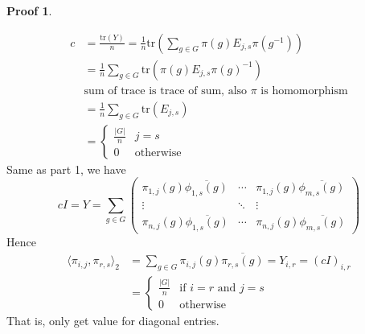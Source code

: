 \documentclass{book}
\newcommand{\inner}[1]{\langle #1 \rangle}
\newcommand{\abs}[1]{\lvert #1 \rvert }
\newcommand{\tr}[1]{\textrm{tr}( #1 )}
\theoremstyle{definition}
\theoremstyle{remarkstyle}
\newtheorem*{myproof}{Proof}%
\begin{document}
\begin{myproof}
\begin{itemize}
        \begin{align*}
            c &= \frac{\tr{Y}}{n} = \frac{1}{n}\tr{\sum_{g\in G}\pi(g)E_{j,s}\pi(g^{-1})} \\
            &= \frac{1}{n}\sum_{g\in G}\tr{\pi(g)E_{j,s}\pi(g)^{-1}} \\
            &\textrm{sum of trace is trace of sum, also $\pi$ is homomorphism} \\
            &= \frac{1}{n}\sum_{g\in G}\tr{E_{j,s}} \\
            &= \left\{
            \begin{array}{ll}
                \frac{\abs{G}}{n} & j=s  \\
                0 & \textrm{otherwise}
            \end{array}
            \right.
        \end{align*}
        Same as part 1, we have 
        $$
        cI = Y = \sum_{g\in G}\left(
            \begin{array}{ccc}
                \pi_{1,j}(g)\overline{\phi_{1,s}(g)} & \cdots & 
                \pi_{1,j}(g)\overline{\phi_{m,s}(g)}  \\
                \vdots & \ddots & \vdots \\
                \pi_{n,j}(g)\overline{\phi_{1,s}(g)} & \cdots &
                \pi_{n,j}(g)\overline{\phi_{m,s}(g)}
            \end{array}
            \right)
        $$
        Hence 
        \begin{align*}
            \inner{\pi_{i,j},\pi_{r,s}}_2 
             &= \sum_{g\in G}\pi_{i,j}(g)\overline{\pi_{r,s}(g)} = Y_{i,r} = (cI)_{i,r} \\
             &= \left\{
            \begin{array}{ll}
                \frac{\abs{G}}{n} & \textrm{if $i=r$ and $j=s$}  \\
                0 & \textrm{otherwise}
            \end{array}
            \right.
        \end{align*}
        That is, only get value for diagonal entries. \newline
    \end{itemize}
\end{myproof}
\end{document}
